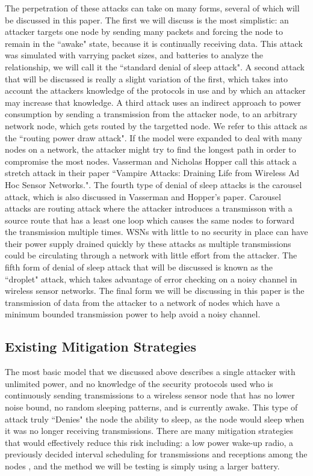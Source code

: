 The perpetration of these attacks can take on many forms, several of which will be discussed in this paper. The first we will discuss is the most simplistic: an attacker targets one node by sending many packets and forcing the
node to remain in the ``awake" state, because it is continually receiving data. This attack was simulated with varrying packet sizes, and batteries to analyze the relationship, we will call it the ``standard denial of sleep attack". A second attack that will be discussed is really a 
slight variation of the first, which takes into account the attackers knowledge of the protocols in use and by which an attacker may increase that knowledge\cite{4476299}. A third attack uses an indirect approach to power 
consumption by sending a transmission from the attacker node, to an arbitrary network node, which gets routed by the targetted node. We refer to this attack as the ``routing power draw attack". If the model were expanded to deal with many nodes on a network, the attacker might try to 
find the longest path in order to compromise the most nodes. Vasserman and Nicholas Hopper call this attack a stretch attack in their paper ``Vampire Attacks: Draining Life from Wireless Ad Hoc Sensor Networks."\cite{6112758}.
The fourth type of denial of sleep attacks is the carousel attack, which is also discussed in Vasserman and Hopper's paper. Carousel attacks are routing attack where the attacker introduces a transmisson with a source route that has a least one loop which causes the same nodes to forward the transmission multiple times\cite{6112758}. WSNs with little to no security in place can have their power supply drained quickly by these attacks as multiple transmissions could be circulating through a network with little effort from the attacker.
The fifth form of denial of sleep attack that will be discussed is known as the ``droplet" attack, which takes advantage of error checking on a noisy channel in wireless sensor networks\cite{6680296}. The final form we will be 
discussing in this paper is the transmission of data from the attacker to a network of nodes which have a minimum bounded transmission power to help avoid a noisy channel.  

\subsection{Existing Mitigation Strategies}

The most basic model that we discussed above describes a single attacker with unlimited power, and no knowledge of the security protocols used who is continuously sending transmissions to a wireless sensor node that has no lower 
noise bound, no random sleeping patterns, and is currently awake. This type of attack truly ``Denies" the node the ability to sleep, as the node would sleep when it was no longer receiving transmissions. There are many mitigation
strategies that would effectively reduce this risk including: a low power wake-up radio\cite{5211020}, a previously decided interval scheduling for transmissions and receptions among the nodes \cite{4476299}, and the method we will be testing
is simply using a larger battery.

